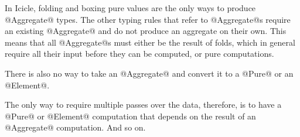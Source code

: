 In Icicle, folding and boxing pure values are the only ways to produce @Aggregate@ types.
The other typing rules that refer to @Aggregate@s require an existing @Aggregate@ and do not produce an aggregate on their own.
This means that all @Aggregate@s must either be the result of folds, which in general require all their input before they can be computed, or pure computations.

There is also no way to take an @Aggregate@ and convert it to a @Pure@ or an @Element@.

The only way to require multiple passes over the data, therefore, is to have a @Pure@ or @Element@ computation that depends on the result of an @Aggregate@ computation.
And so on.


